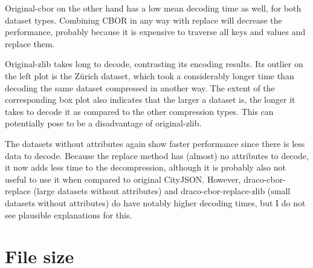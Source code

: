 Original-cbor on the other hand has a low mean decoding time as well, for both dataset types.
Combining CBOR in any way with replace will decrease the performance, probably because it is expensive to traverse all keys and values and replace them.

Original-zlib takes long to decode, contrasting its encoding results.
Its outlier on the left plot is the Zürich dataset, which took a considerably longer time than decoding the same dataset compressed in another way.
The extent of the corresponding box plot also indicates that the larger a dataset is, the longer it takes to decode it as compared to the other compression types. 
This can potentially pose to be a disadvantage of original-zlib.

The datasets without attributes again show faster performance since there is less data to decode.
Because the replace method has (almost) no attributes to decode, it now adds less time to the decompression, although it is probably also not useful to use it when compared to original CityJSON.
However, draco-cbor-replace (large datasets without attributes) and draco-cbor-replace-zlib (small datasets without attributes) do have notably higher decoding times, but I do not see plausible explanations for this.



\newpage
\section{File size}
\label{sec:filesizeperformance}

